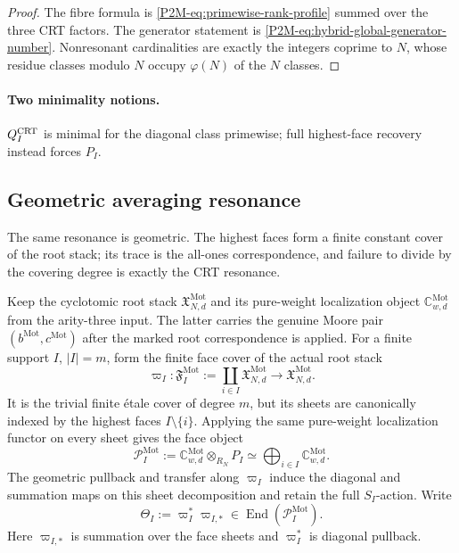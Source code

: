 \documentclass[11pt]{article}
\theoremstyle{remark}
\newcommand{\Mot}{\mathrm{Mot}}
\begin{document}
\begin{proof}
The fibre formula is \eqref{P2M-eq:primewise-rank-profile} summed over the three
CRT factors.  The generator statement is
\eqref{P2M-eq:hybrid-global-generator-number}.  Nonresonant cardinalities are
exactly the integers coprime to \(N\), whose residue classes modulo \(N\)
occupy \(\varphi(N)\) of the \(N\) classes.
\end{proof}

\paragraph{Two minimality notions.}
\(Q_I^{\rm CRT}\) is minimal for the diagonal class primewise; full
highest-face recovery instead forces \(P_I\).


\subsection{Geometric averaging resonance}

The same resonance is geometric.  The highest faces form a finite
constant cover of the root stack; its trace is the all-ones correspondence,
and failure to divide by the covering degree is exactly the CRT resonance.

Keep the cyclotomic root stack \(\mathfrak X^{\Mot}_{N,d}\) and its
pure-weight localization object \(\mathbb C^{\Mot}_{w,d}\) from the
arity-three input.  The latter carries the genuine Moore pair
\((b^{\Mot},c^{\Mot})\) after the marked root correspondence is applied.
For a finite support \(I\), \(|I|=m\), form the finite face cover of the
actual root stack
\begin{equation}
 \boxed{
 \varpi_I:\mathfrak F_I^{\Mot}
 :=\coprod_{i\in I}\mathfrak X^{\Mot}_{N,d}
 \longrightarrow \mathfrak X^{\Mot}_{N,d}.}
\end{equation}
It is the trivial finite \'etale cover of degree \(m\), but its sheets are
canonically indexed by the highest faces \(I\setminus\{i\}\).  Applying
the same pure-weight localization functor on every sheet gives the face object
\[
 \mathcal P_I^{\Mot}
 :=\mathbb C^{\Mot}_{w,d}\otimes_{R_N}P_I
 \simeq \bigoplus_{i\in I}\mathbb C^{\Mot}_{w,d}.
\]
The geometric pullback and transfer along \(\varpi_I\) induce the diagonal
and summation maps on this sheet decomposition and retain the full
\(S_I\)-action.  Write
\begin{equation}
 \boxed{
 \Theta_I:=\varpi_I^*\varpi_{I,*}
 \in\operatorname{End}(\mathcal P_I^{\Mot}).}
\end{equation}
Here \(\varpi_{I,*}\) is summation over the face sheets and
\(\varpi_I^*\) is diagonal pullback.
\end{document}
